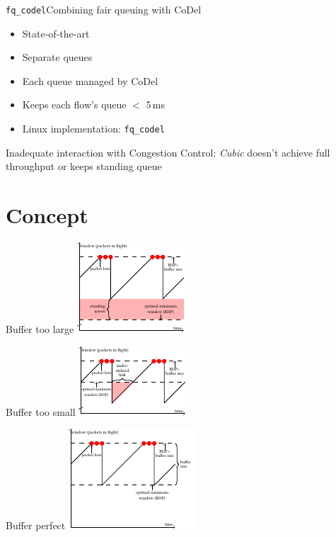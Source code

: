 \documentclass[xcolor={dvipsnames}]{beamer}
\begin{document}
\begin{frame}{\texttt{fq\_codel}}{Combining fair queuing with CoDel}
  \begin{itemize}
  \item State-of-the-art
  \item Separate queues
  \item Each queue managed by CoDel
  \item Keeps each flow's queue $<$ 5\,ms
  \item Linux implementation: \texttt{fq\_codel}
  \pause
  \end{itemize}
  \begin{alertblock}{Inadequate interaction with Congestion Control:}
	\textit{Cubic} doesn't achieve full throughput or keeps standing queue 
  \end{alertblock}
\end{frame}

\section{Concept}

\begin{frame}{Buffer too large}
            \centering
  \includegraphics[height=0.9\textheight,keepaspectratio]{figures/cocoa_illustration_too_much.pdf}
\end{frame}

\begin{frame}{Buffer too small}
            \centering
  \includegraphics[height=0.9\textheight,keepaspectratio]{figures/cocoa_illustration_too_little.pdf}
\end{frame}

\begin{frame}{Buffer perfect}
            \centering
  \includegraphics[height=0.9\textheight,keepaspectratio]{figures/cocoa_illustration_perfect.pdf}
\end{frame}
\end{document}
